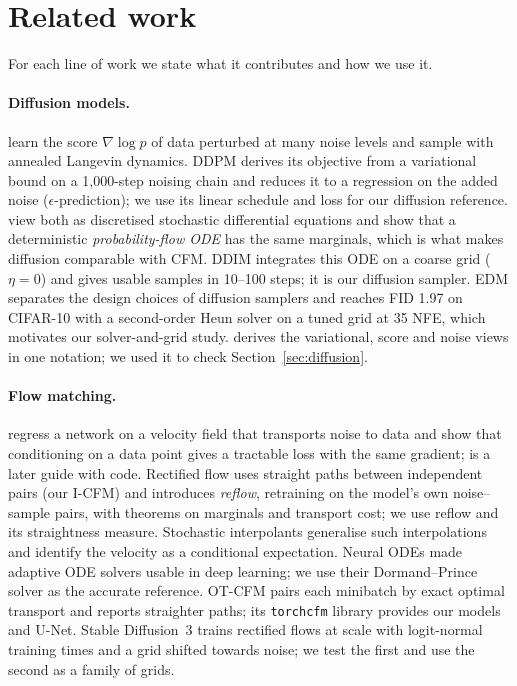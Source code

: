 \section{Related work}\label{sec:related}
For each line of work we state what it contributes and how we use it.

\paragraph{Diffusion models.} \citet{song2019ncsn} learn the score $\nabla\log p$ of data perturbed at many noise levels and sample with annealed Langevin dynamics. DDPM \citep{ho2020ddpm} derives its objective from a variational bound on a 1,000-step noising chain and reduces it to a regression on the added noise ($\epsilon$-prediction); we use its linear schedule and loss for our diffusion reference. \citet{song2021sde} view both as discretised stochastic differential equations and show that a deterministic \emph{probability-flow ODE} has the same marginals, which is what makes diffusion comparable with CFM. DDIM \citep{song2021ddim} integrates this ODE on a coarse grid ($\eta=0$) and gives usable samples in 10--100 steps; it is our diffusion sampler. EDM \citep{karras2022edm} separates the design choices of diffusion samplers and reaches FID 1.97 on CIFAR-10 with a second-order Heun solver on a tuned grid at 35 NFE, which motivates our solver-and-grid study. \citet{luo2022understanding} derives the variational, score and noise views in one notation; we used it to check Section~\ref{sec:diffusion}.

\paragraph{Flow matching.} \citet{lipman2023fm} regress a network on a velocity field that transports noise to data and show that conditioning on a data point gives a tractable loss with the same gradient; \citet{lipman2024guide} is a later guide with code. Rectified flow \citep{liu2023rf} uses straight paths between independent pairs (our I-CFM) and introduces \emph{reflow}, retraining on the model's own noise--sample pairs, with theorems on marginals and transport cost; we use reflow and its straightness measure. Stochastic interpolants \citep{albergo2023si} generalise such interpolations and identify the velocity as a conditional expectation. Neural ODEs \citep{chen2018node} made adaptive ODE solvers usable in deep learning; we use their Dormand--Prince solver \citep{dormand1980rk} as the accurate reference. OT-CFM \citep{tong2024otcfm} pairs each minibatch by exact optimal transport and reports straighter paths; its \texttt{torchcfm} library provides our models and U-Net. Stable Diffusion~3 \citep{esser2024sd3} trains rectified flows at scale with logit-normal training times and a grid shifted towards noise; we test the first and use the second as a family of grids.

